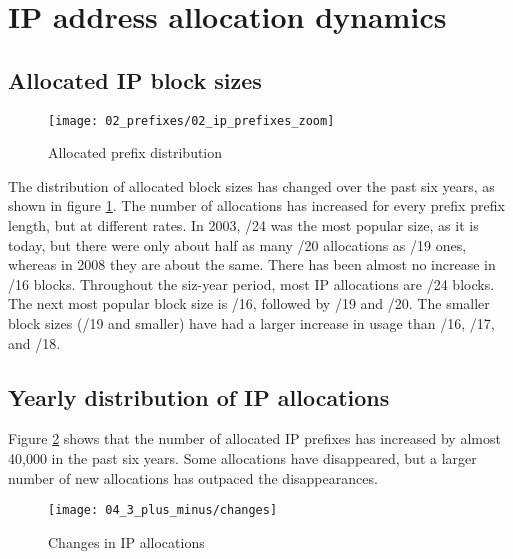\section{IP address allocation dynamics}
\label{sec:allocations}

\subsection{Allocated IP block sizes}

\begin{figure}[htbp]
 	\centering
 		\texttt{[image: 02\_prefixes/02\_ip\_prefixes\_zoom]}
	\caption{Allocated prefix distribution}
 	\label{fig:IP allocations}
\end{figure}

The distribution of allocated block sizes has changed over the past six years, as shown in figure \ref{fig:IP allocations}. The number of allocations has increased for every prefix prefix length, but at different rates. In 2003, /24 was the most popular size, as it is today, but there were only about half as many /20 allocations as /19 ones, whereas in 2008 they are about the same. There has been almost no increase in /16 blocks. Throughout the siz-year period, most IP allocations are /24 blocks. The next most popular block size is /16, followed by /19 and /20. The smaller block sizes (/19 and smaller) have had a larger increase in usage than /16, /17, and /18.

\subsection{Yearly distribution of IP allocations}


Figure \ref{fig:IP allocations new and gone} shows that the number of allocated IP prefixes has increased by almost 40,000 in the past six years. Some allocations have disappeared, but a larger number of new allocations has outpaced the disappearances.

\begin{figure}[htbp]
    \centering
        \texttt{[image: 04\_3\_plus\_minus/changes]}
    \caption{Changes in IP allocations}
    \label{fig:IP allocations new and gone}
\end{figure}


